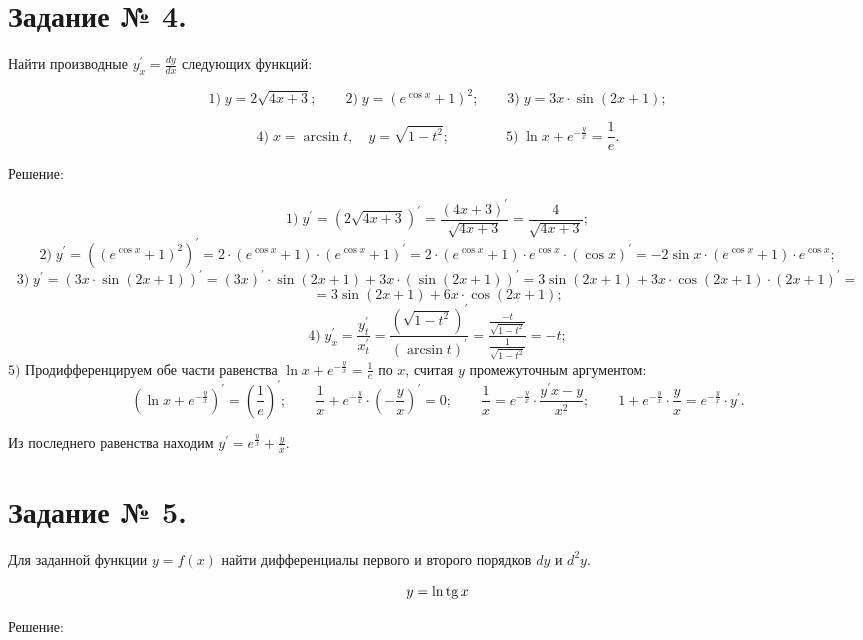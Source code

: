 \documentclass[fleqn]{article}
\newcommand{\tg}{\mathop{\rm tg}\nolimits}
\begin{document}
\section*{Задание № 4.}

Найти производные $y_x ^\prime=\frac{dy}{dx}$ следующих функций:

$$1)\;y=2\sqrt{4x+3};\qquad2)\;y=(e^{\cos{x}}+1)^2;\qquad3)\;y=3x\cdot\sin{(2x+1)};$$

$$4)\;x=\arcsin{t},\quad y=\sqrt{1-t^2};\qquad\qquad5)\;\ln{x}+e^{-\frac{y}{x}}=\frac{1}{e}.$$

\begin{center}Решение:\end{center}

$$1)\;y^\prime=\left(2\sqrt{4x+3}\right)^\prime=\frac{\left(4x+3\right)^\prime}{\sqrt{4x+3}}=\frac{4}{\sqrt{4x+3}};$$
$$2)\;y^\prime=\left(\left(e^{\cos{x}}+1\right)^2\right)^\prime=2\cdot\left(e^{\cos{x}}+1\right)\cdot\left(e^{\cos{x}}+1\right)^\prime=2\cdot\left(e^{\cos{x}}+1\right)\cdot e^{\cos{x}}\cdot\left(\cos{x}\right)^\prime=-2\sin{x}\cdot\left(e^{\cos{x}}+1\right)\cdot e^{\cos{x}};$$
$$3)\;y^\prime=\left(3x\cdot\sin{(2x+1)}\right)^\prime=\left(3x\right)^\prime\cdot\sin{(2x+1)}+3x\cdot\left(\sin{(2x+1)}\right)^\prime=3\sin{(2x+1)}+3x\cdot\cos{(2x+1)}\cdot(2x+1)^\prime=$$
$$=3\sin{(2x+1)}+6x\cdot\cos{(2x+1)};$$
$$4)\;y_x^\prime=\frac{y_t^\prime}{x_t^\prime}=\frac{\left(\sqrt{1-t^2}\right)^\prime}{(\arcsin{t})^\prime}=\frac{\frac{-t}{\sqrt{1-t^2}}}{\frac{1}{\sqrt{1-t^2}}}=-t;$$
$5)$ Продифференцируем обе части равенства $\ln{x}+e^{-\frac{y}{x}}=\frac{1}{e}$ по $x$, считая $y$ промежуточным аргументом: $$\left(\ln{x}+e^{-\frac{y}{x}}\right)^\prime=\left(\frac{1}{e}\right)^\prime;\qquad  \frac{1}{x}+e^{-\frac{y}{x}}\cdot\left(-\frac{y}{x}\right)^\prime=0;\qquad
\frac{1}{x}=e^{-\frac{y}{x}}\cdot\frac{y^\prime x-y}{x^2};\qquad
1+e^{-\frac{y}{x}}\cdot\frac{y}{x}=e^{-\frac{y}{x}}\cdot y^\prime.$$

Из последнего равенства находим $y^\prime=e^{\frac{y}{x}}+\frac{y}{x}$.

\section*{Задание № 5.}

Для заданной функции $y=f(x)$ найти дифференциалы первого и второго порядков $dy$ и $d^2y$.

$$y=\ln{\tg{x}}$$

\begin{center}Решение:\end{center}
\end{document}
